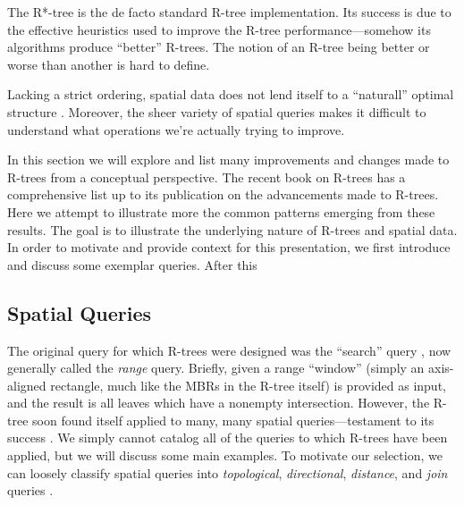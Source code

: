 \newcommand{\keyword}[1]{\textbf{#1}}


The R*-tree is the de facto standard R-tree implementation.
Its success is due to the effective heuristics used to improve the R-tree performance---somehow its algorithms produce ``better'' R-trees.
The notion of an R-tree being better or worse than another is hard to define.

Lacking a strict ordering, spatial data does not lend itself to a ``naturall'' optimal structure \cite{gaedegunther98}.
Moreover, the sheer variety of spatial queries makes it difficult to understand what operations we're actually trying to improve.

In this section we will explore and list many improvements and changes made to R-trees from a conceptual perspective.
The recent book on R-trees \cite{thebook} has a comprehensive list up to its publication on the advancements made to R-trees.
Here we attempt to illustrate more the common patterns emerging from these results.
The goal is to illustrate the underlying nature of R-trees and spatial data.
In order to motivate and provide context for this presentation, we first introduce and discuss some exemplar queries.
After this

\subsection{Spatial Queries}
The original query for which R-trees were designed was the ``search'' query \cite{guttman84}, now generally called the \emph{range} query.
Briefly, given a range ``window'' (simply an axis-aligned rectangle, much like the MBRs in the R-tree itself) is provided as input, and the result is all leaves which have a nonempty intersection.
However, the R-tree soon found itself applied to many, many spatial queries---testament to its success \cite{something}.
We simply cannot catalog all of the queries to which R-trees have been applied, but we will discuss some main examples.
To motivate our selection, we can loosely classify spatial queries into \emph{topological}, \emph{directional}, \emph{distance}, and \emph{join} queries \cite{thebook,manolopoulosnanopoulospapadopoulostheodoridis03}.

